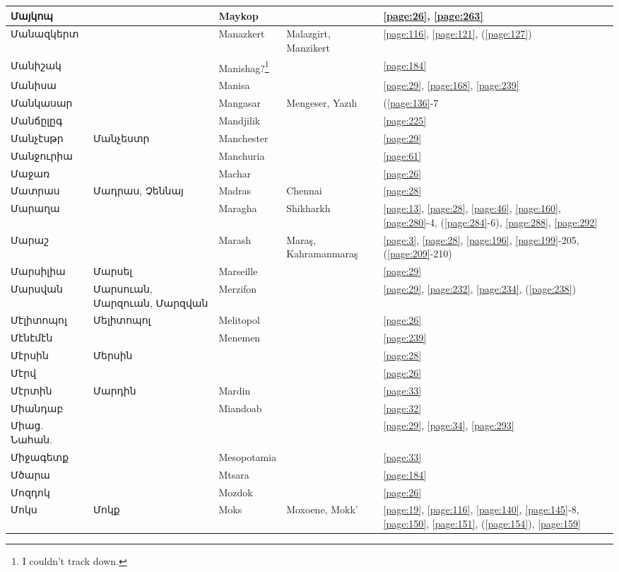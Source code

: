 \begin{center}
\begin{longtable}{|p{}|p{3cm}|p{3cm}|p{2cm}|p{3cm}|}
Մայկոպ& & Maykop& &\ref{page:26}, \ref{page:263}\\ \hline
Մանազկերտ& &Manazkert  & Malazgirt,  Manzikert &\ref{page:116}, \ref{page:121}, (\ref{page:127})\\ \hline
Մանիշակ& & Manishag?\footnote{I couldn't track down.}& &\ref{page:184}\\ \hline
Մանիսա& &Manisa & &\ref{page:29}, \ref{page:168}, \ref{page:239}\\ \hline
Մանկասար& & Mangasar  &Mengeser, Yazılı &(\ref{page:136}-7\\ \hline
Մանճըլըգ& &Mandjilik & &\ref{page:225}\\ \hline
Մանչէսթր&   Մանչեստր & Manchester& &\ref{page:29}\\ \hline
Մանջուրիա& &Manchuria & &\ref{page:61}\\ \hline
Մաջառ& & Machar&  &\ref{page:26}\\ \hline
Մատրաս& Մադրաս, Չեննայ& Madras& Chennai&\ref{page:28}\\ \hline
Մարաղա& & Maragha& Shikharkh&\ref{page:13}, \ref{page:28}, \ref{page:46}, \ref{page:160}, \ref{page:280}-4, (\ref{page:284}-6), \ref{page:288}, \ref{page:292}\\ \hline
Մարաշ& & Marash & Maraş, Kahramanmaraş  &\ref{page:3}, \ref{page:28}, \ref{page:196}, \ref{page:199}-205, (\ref{page:209}-210)\\ \hline
Մարսիլիա&Մարսել &Marseille & &\ref{page:29}\\ \hline
Մարսվան&Մարսուան, Մարզուան, Մարզվան &Merzifon & &\ref{page:29}, \ref{page:232}, \ref{page:234}, (\ref{page:238})\\ \hline
Մէլիտոպոլ&Մելիտոպոլ &Melitopol & &\ref{page:26}\\ \hline
Մէնէմէն& &Menemen & &\ref{page:239}\\ \hline
Մէրսին&Մերսին & & &\ref{page:28}\\ \hline
Մէրվ& & & &\ref{page:26}\\ \hline
Մէրտին& Մարդին&Mardin & &\ref{page:33}\\ \hline
Միանդաբ& &Miandoab & &\ref{page:32}\\ \hline
Միաց. Նահան.& & & &\ref{page:29}, \ref{page:34}, \ref{page:293}\\ \hline
Միջագետք& &
Mesopotamia& &\ref{page:33}\\ \hline
Մծարա& &Mtsara & &\ref{page:184}\\ \hline
Մոզդոկ& & Mozdok& &\ref{page:26}\\ \hline
Մոկս& Մոկք& Moks&Moxoene, Mokk' &\ref{page:19}, \ref{page:116}, \ref{page:140}, \ref{page:145}-8, \ref{page:150}, \ref{page:151}, (\ref{page:154}), \ref{page:159}\\ \hline

\end{longtable}
\end{center}
